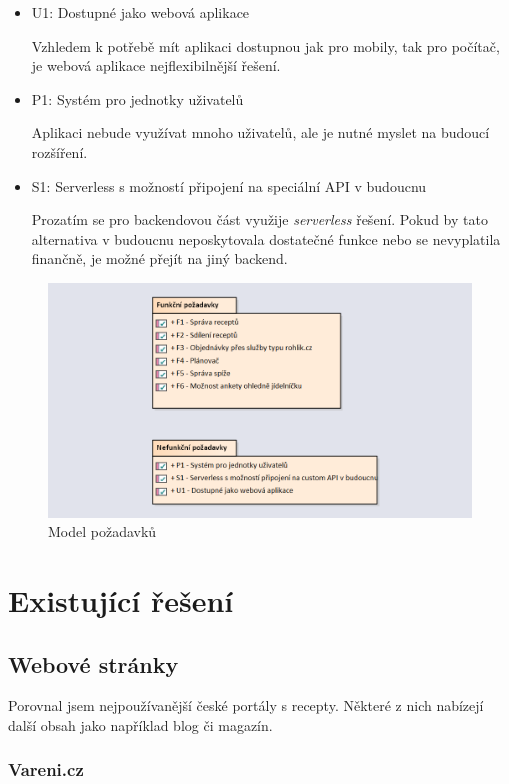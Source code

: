 \begin{itemize}
    \item U1: Dostupné jako webová aplikace

    Vzhledem k potřebě mít aplikaci dostupnou jak pro mobily, tak pro počítač, je webová aplikace nejflexibilnější řešení.
    \item P1: Systém pro jednotky uživatelů

    Aplikaci nebude využívat mnoho uživatelů, ale je nutné myslet na budoucí rozšíření.
    \item S1: Serverless s možností připojení na speciální API v budoucnu

    Prozatím se pro backendovou část využije \emph{serverless} řešení. Pokud by tato alternativa v budoucnu neposkytovala dostatečné
    funkce nebo se nevyplatila finančně, je možné přejít na jiný backend.
\end{itemize}

\begin{figure}[H]
    \includegraphics[width=\textwidth]{images/pozadavky}
    \caption{Model požadavků} \label{picture:recipeo:pozadavky}
\end{figure}

\section{Existující řešení}

\subsection{Webové stránky}

Porovnal jsem nejpoužívanější české portály s recepty. Některé z nich nabízejí další obsah jako například blog či magazín.

\subsubsection{Vareni.cz}

